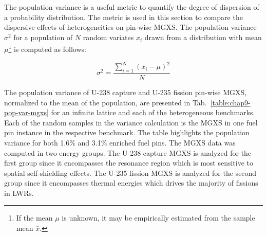 The population variance is a useful metric to quantify the degree of dispersion of a probability distribution. The metric is used in this section to compare the dispersive effects of heterogeneities on pin-wise \ac{MGXS}. The population variance $\sigma^2$ for a population of $N$ random variates $x_{i}$ drawn from a distribution with mean $\mu$\footnote{If the mean $\mu$ is unknown, it may be empirically estimated from the sample mean $\bar{x}$.} is computed as follows:

\begin{equation}
\label{eqn:chap9-pop-var}
\sigma^2 = \frac{\displaystyle\sum\limits_{i=1}^{N}(x_{i} - \mu)^{2}}{N}
\end{equation}

The population variance of U-238 capture and U-235 fission pin-wise \ac{MGXS}, normalized to the mean of the population, are presented in Tab.~\ref{table:chap9-pop-var-mgxs} for an infinite lattice and each of the heterogeneous benchmarks. Each of the random samples in the variance calculation is the \ac{MGXS} in one fuel pin instance in the respective benchmark. The table highlights the population variance for both 1.6\% and 3.1\% enriched fuel pins. The \ac{MGXS} data was computed in two energy groups. The U-238 capture \ac{MGXS} is analyzed for the first group since it encompasses the resonance region which is most sensitive to spatial self-shielding effects. The U-235 fission \ac{MGXS} is analyzed for the second group since it encompasses thermal energies which drives the majority of fissions in \acp{LWR}.

